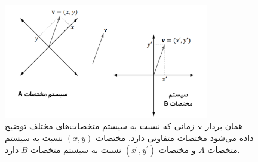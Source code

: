 {\begin{spacing}{1.5}
        \begin{figure}[H]
            \centering
            \setlength{\belowcaptionskip}{-10pt}
            \includegraphics[width=0.8\textwidth]{Images/4/3/4.Session.1.3.10}
            \caption {همان بردار $\textbf{v}$ زمانی که نسبت به سیستم متخصات‌های مختلف توضیح داده می‌شود مختصات متفاوتی دارد. مختصات $(x, y)$ نسبت به سیستم متخصات $A$ و مختصات $(x^\prime, y^\prime)$ نسبت به سیستم متخصات $B$ دارد.}
            \label{fig:4.Session.1.3.10}
        \end{figure}
    \end{spacing}
}

